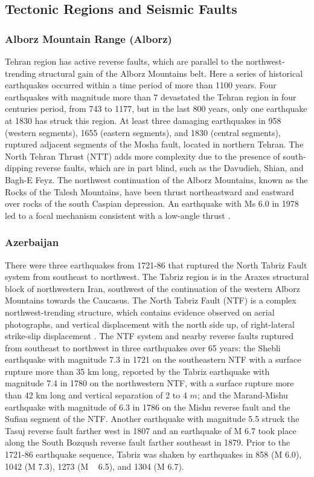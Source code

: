 \subsection{Tectonic Regions and Seismic Faults}

\subsubsection{Alborz Mountain Range (Alborz)}
Tehran region has active reverse faults, which are parallel to the northwest-trending structural gain of the Alborz Mountains belt. Here a series of historical earthquakes occurred within a time period of more than 1100 years. Four earthquakes with magnitude more than 7 devastated the Tehran region in four centuries period, from 743 to 1177, but in the last 800 years, only one earthquake at 1830 has struck this region. At least three damaging earthquakes in 958 (western segments), 1655 (eastern segments), and 1830 (central segments), ruptured adjacent segments of the Mosha fault, located in northern Tehran.
The North Tehran Thrust (NTT) adds more complexity due to the presence of south-dipping reverse faults, which are in part blind, such as the Davudieh, Shian, and Bagh-E Feyz.
The northwest continuation of the Alborz Mountains, known as the Rocks of the Talesh Mountains, have been thrust northeastward and eastward over rocks of the south Caspian depression. An earthquake with Ms 6.0 in 1978 led to a focal mechanism consistent with a low-angle thrust \citep{Berberian1999}.

\subsubsection{Azerbaijan}
There were three earthquakes from 1721-86 that ruptured the North Tabriz Fault system from southeast to northwest. The Tabriz region is in the Araxes structural block of northwestern Iran, southwest of the continuation of the western Alborz Mountains towards the Caucasus. The North Tabriz Fault (NTF) is a complex northwest-trending structure, which contains evidence observed on aerial photographs, and vertical displacement with the north side up, of right-lateral strike-slip displacement \citep{Berberian1999}.
The NTF system and nearby reverse faults ruptured from southeast to northwest in three earthquakes over 65 years: the Shebli earthquake with magnitude 7.3 in 1721 on the southeastern NTF with a surface rupture more than 35 km long, reported by \citet{Jones1834} the Tabriz earthquake with magnitude 7.4 in 1780 on the northwestern NTF, with a surface rupture more than 42 km long and vertical separation of 2 to 4 $m$; and the Marand-Mishu earthquake with magnitude of 6.3 in 1786 on the Mishu reverse fault and the Sufian segment of the NTF. Another earthquake with  magnitude 5.5 struck the Tasuj reverse fault farther west in 1807 and an earthquake of M 6.7 took place along the South Bozqush reverse fault farther southeast in 1879. Prior to the 1721-86 earthquake sequence, Tabriz was shaken by earthquakes in 858 (M 6.0), 1042 (M 7.3), 1273 (M ~ 6.5), and 1304 (M 6.7)\citep{Berberian1999}. 


